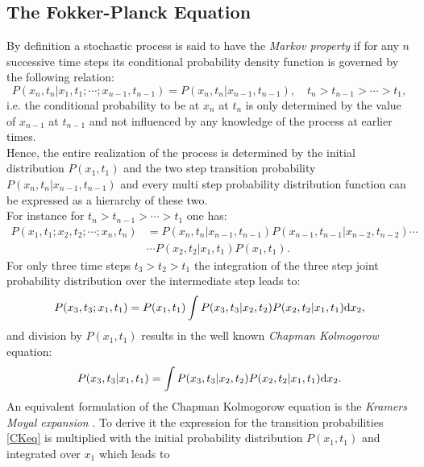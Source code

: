 \subsection{The Fokker-Planck Equation}
\label{The_Fokker_Planck_Equation}
By definition a stochastic process is said to have the \emph{Markov property} if for any $n$ successive time steps its conditional probability density function is governed by the following relation:
\begin{equation}
    P(x_{n},t_{n}|x_{1},t_{1};\cdots;x_{n-1},t_{n-1}) = P(x_{n},t_{n}|x_{n-1},t_{n-1}), \quad t_{n}>t_{n-1}> \cdots >t_{1},
    \label{}
\end{equation}
i.e. the conditional probability to be at $x_n$ at $t_n$ is only determined by the value of $x_{n-1}$ at $t_{n-1}$ and not influenced by any knowledge of the process at earlier times.\\
Hence, the entire realization of the process is determined by the initial distribution $P(x_1,t_1)$ and the two step transition probability $P(x_{n},t_{n}|x_{n-1},t_{n-1})$ and every multi step probability distribution function can be expressed as a hierarchy of these two. \\
For instance for $ t_n > t_{n-1} > \cdots > t_1$ one has:
\begin{align}
    P(x_1,t_1;x_2,t_2;\cdots;x_n,t_n) &= P(x_n,t_n|x_{n-1},t_{n-1})P(x_{n-1},t_{n-1}|x_{n-2},t_{n-2}) \cdots \nonumber \\
                                      & \cdots P(x_2,t_2|x_1,t_1)P(x_1,t_1).
    \label{hierarchy}
\end{align}
For only three time steps $t_3>t_2>t_1$ the integration of the three step joint probability distribution over the intermediate step leads to:
\begin{equation}
    P(x_3,t_3;x_1,t_1) = P(x_1,t_1)\int P(x_3,t_3|x_2,t_2) P(x_2,t_2|x_1,t_1) {\rm d} x_2,
\end{equation}
and division by $P(x_1,t_1)$ results in the well known \emph{Chapman Kolmogorow} equation:
\begin{equation}
    P(x_3,t_3|x_1,t_1) = \int P(x_3,t_3|x_2,t_2) P(x_2,t_2|x_1,t_1) {\rm d} x_2.
    \label{CKeq}
\end{equation}
An equivalent formulation of the Chapman Kolmogorow equation is the \emph{Kramers Moyal expansion} \cite{Kramers1940, Moyal1949}. To derive it the expression for the transition probabilities \eqref{CKeq} is multiplied with the initial probability distribution $P(x_1,t_1)$ and integrated over $x_1$ which leads to
